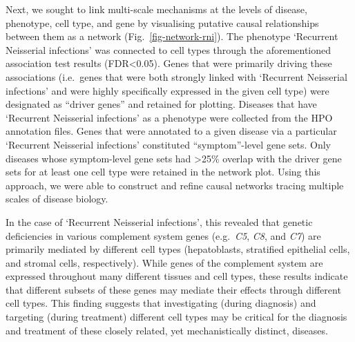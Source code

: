 \documentclass[
]{article}
\begin{document}
Next, we sought to link multi-scale mechanisms at the levels of disease,
phenotype, cell type, and gene by visualising putative causal
relationships between them as a network (Fig.~\ref{fig-network-rni}).
The phenotype `Recurrent Neisserial infections' was connected to cell
types through the aforementioned association test results
(FDR\textless0.05). Genes that were primarily driving these associations
(i.e.~genes that were both strongly linked with `Recurrent Neisserial
infections' and were highly specifically expressed in the given cell
type) were designated as ``driver genes'' and retained for plotting.
Diseases that have `Recurrent Neisserial infections' as a phenotype were
collected from the HPO annotation files. Genes that were annotated to a
given disease via a particular `Recurrent Neisserial infections'
constituted ``symptom''-level gene sets. Only diseases whose
symptom-level gene sets had \textgreater25\% overlap with the driver
gene sets for at least one cell type were retained in the network plot.
Using this approach, we were able to construct and refine causal
networks tracing multiple scales of disease biology.

In the case of `Recurrent Neisserial infections', this revealed that
genetic deficiencies in various complement system genes (e.g.~\emph{C5},
\emph{C8}, and \emph{C7}) are primarily mediated by different cell types
(hepatoblasts, stratified epithelial cells, and stromal cells,
respectively). While genes of the complement system are expressed
throughout many different tissues and cell types, these results indicate
that different subsets of these genes may mediate their effects through
different cell types. This finding suggests that investigating (during
diagnosis) and targeting (during treatment) different cell types may be
critical for the diagnosis and treatment of these closely related, yet
mechanistically distinct, diseases.
\end{document}
